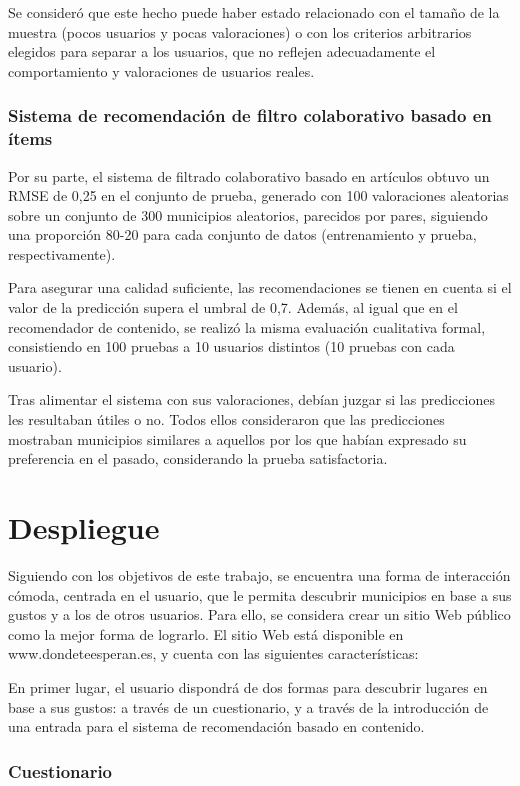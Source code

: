 Se consideró que este hecho puede haber estado relacionado con el tamaño de la muestra (pocos usuarios y pocas valoraciones) o con los criterios arbitrarios elegidos para separar a los usuarios, que no reflejen adecuadamente el comportamiento y valoraciones de usuarios reales.
 
\subsubsection{Sistema de recomendación de filtro colaborativo basado en ítems}

Por su parte, el sistema de filtrado colaborativo basado en artículos obtuvo un RMSE de 0,25 en el conjunto de prueba, generado con 100 valoraciones aleatorias sobre un conjunto de 300 municipios aleatorios, parecidos por pares, siguiendo una proporción 80-20 para cada conjunto de datos (entrenamiento y prueba, respectivamente).

Para asegurar una calidad suficiente, las recomendaciones se tienen en cuenta si el valor de la predicción supera el umbral de 0,7. Además, al igual que en el recomendador de contenido, se realizó la misma evaluación cualitativa formal, consistiendo en 100 pruebas a 10 usuarios distintos (10 pruebas con cada usuario).

Tras alimentar el sistema con sus valoraciones, debían juzgar si las predicciones les resultaban útiles o no. Todos ellos consideraron que las predicciones mostraban municipios similares a aquellos por los que habían expresado su preferencia en el pasado, considerando la prueba satisfactoria.

\section{Despliegue}

Siguiendo con los objetivos de este trabajo, se encuentra una forma de interacción cómoda, centrada en el usuario, que le permita descubrir municipios en base a sus gustos y a los de otros usuarios. Para ello, se considera crear un sitio Web público como la mejor forma de lograrlo. El sitio Web está disponible en www.dondeteesperan.es, y cuenta con las siguientes características:

En primer lugar, el usuario dispondrá de dos formas para descubrir lugares en base a sus gustos: a través de un cuestionario, y a través de la introducción de una entrada para el sistema de recomendación basado en contenido.

\subsubsection{Cuestionario}

